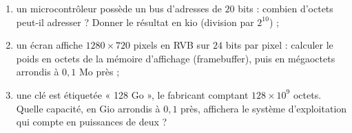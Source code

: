 \begin{exercice}
\begin{enumerate}
\item un microcontrôleur possède un bus d'adresses de $20$ bits : combien d'octets peut-il adresser ? Donner le résultat en kio (division par $2^{10}$) ;
\item un écran affiche $1280 \times 720$ pixels en RVB sur $24$ bits par pixel : calculer le poids en octets de la mémoire d'affichage (framebuffer), puis en mégaoctets arrondis à $0{,}1$ Mo près ;
\item une clé est étiquetée « 128 Go », le fabricant comptant $128 \times 10^9$ octets. Quelle capacité, en Gio arrondis à $0{,}1$ près, affichera le système d'exploitation qui compte en puissances de deux ?
\end{enumerate}
\end{exercice}
